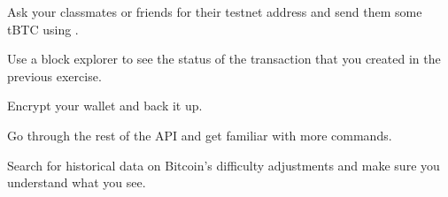 \begin{exercise}
Ask your classmates or friends for their testnet address and send them some tBTC using .
\end{exercise}

\begin{exercise}
Use a block explorer to see the status of the transaction that you created in the previous exercise.
\end{exercise}

\begin{exercise}
Encrypt your wallet and back it up.
\end{exercise}

\begin{exercise}
Go through the rest of the API and get familiar with more commands.
\end{exercise}

\begin{exercise}
Search for historical data on Bitcoin's difficulty adjustments and make sure you understand what you see.
\end{exercise}


